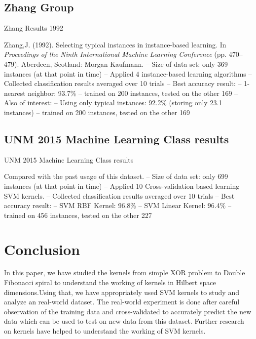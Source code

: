 \documentclass[conference]{IEEEtran}
\begin{document}
\subsection*{Zhang Group}
\begin{table}[h!]
\center
	\caption{Zhang Results 1992}
\label{table:Zhang_Results} \cite{zhang}

	Zhang,J. (1992). Selecting typical instances in instance-based
      learning.  In {\textit{ Proceedings of the Ninth International Machine
      Learning Conference}} (pp. 470--479).  Aberdeen, Scotland: Morgan
      Kaufmann.
      -- Size of data set: only 369 instances (at that point in time)
      -- Applied 4 instance-based learning algorithms 
      -- Collected classification results averaged over 10 trials
      -- Best accuracy result: 
         -- 1-nearest neighbor: 93.7\%
         -- trained on 200 instances, tested on the other 169
      -- Also of interest:
         -- Using only typical instances: 92.2\% (storing only 23.1 instances)
         -- trained on 200 instances, tested on the other 169
\end{table}

\subsection*{UNM 2015 Machine Learning Class results}
\begin{table}[h!]
\center
	\caption{UNM 2015 Machine Learning Class results}
\label{table:My_Results}
 Compared with the past usage of this dataset.
	  -- Size of data set: only 699 instances (at that point in time)
      -- Applied 10 Cross-validation based learning SVM kernels.
      -- Collected classification results averaged over 10 trials
      -- Best accuracy result: 
         -- SVM RBF Kernel: 96.8\%
         -- SVM Linear Kernel: 96.4\%
         -- trained on 456 instances, tested on the other 227
\end{table}

\section{Conclusion}
In this paper, we have studied the kernels from simple XOR problem to Double Fibonacci spiral to understand the working of kernels in Hilbert space dimensions.Using that, we have appropriately used SVM kernels to study and analyze an real-world dataset. The real-world experiment is done after careful observation of the training data and cross-validated to accurately predict the new data which can be used to test on new data from this dataset. Further research on kernels have helped to understand the working of SVM kernels.
\end{document}
